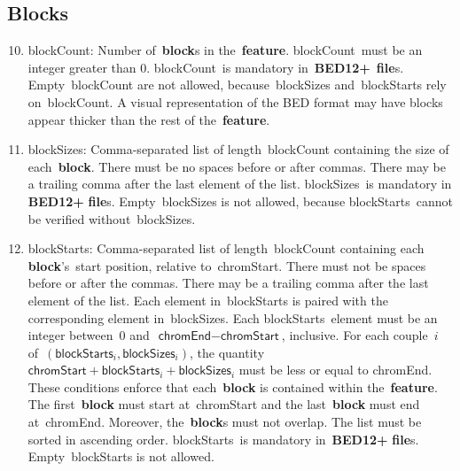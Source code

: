 \documentclass[11pt]{article}
\begin{document}
\subsection{Blocks}
\begin{enumerate}
  \setcounter{enumi}{9}

\item \textsf{blockCount}: Number of~\textbf{block}s in the~\textbf{feature}.
  \textsf{blockCount}~must be an integer greater than 0.
  \textsf{blockCount}~is mandatory in~\textbf{BED12+}~\textbf{file}s.
  Empty~\textsf{blockCount} are not allowed, because~\textsf{blockSizes} and~\textsf{blockStarts} rely on~\textsf{blockCount}.
  A visual representation of the \ac{BED} format may have blocks appear thicker than the rest of the~\textbf{feature}.

\item \textsf{blockSizes}: Comma-separated list of length~\textsf{blockCount} containing the size of each~\textbf{block}.
  There must be no spaces before or after commas.
  There may be a trailing comma after the last element of the list.
  \textsf{blockSizes}~is mandatory in \textbf{BED12+} \textbf{file}s.
  Empty~\textsf{blockSizes} is not allowed, because \textsf{blockStarts}~cannot be verified without~\textsf{blockSizes}.

\item \textsf{blockStarts}: Comma-separated list of length~\textsf{blockCount} containing each \textbf{block}'s~start position, relative to~\textsf{chromStart}.
  There must not be spaces before or after the commas.
  There may be a trailing comma after the last element of the list.
  Each element in~\textsf{blockStarts} is paired with the corresponding element in~\textsf{blockSizes}.
  Each \textsf{blockStarts}~element must be an integer between~0 and~$\textsf{chromEnd} - \textsf{chromStart}$, inclusive.
  For each couple~$i$ of~$(\textsf{blockStarts}_i, \textsf{blockSizes}_i)$, the quantity~$\textsf{chromStart} + \textsf{blockStarts}_i + \textsf{blockSizes}_i$ must be less or equal to \textsf{chromEnd}.
  These conditions enforce that each~\textbf{block} is contained within the~\textbf{feature}.
  The first~\textbf{block} must start at~\textsf{chromStart} and the last~\textbf{block} must end at~\textsf{chromEnd}.
  Moreover, the~\textbf{block}s must not overlap.
  The list must be sorted in ascending order.
  \textsf{blockStarts}~is mandatory in~\textbf{BED12+} \textbf{file}s.
  Empty~\textsf{blockStarts} is not allowed.
\end{enumerate}
\end{document}

